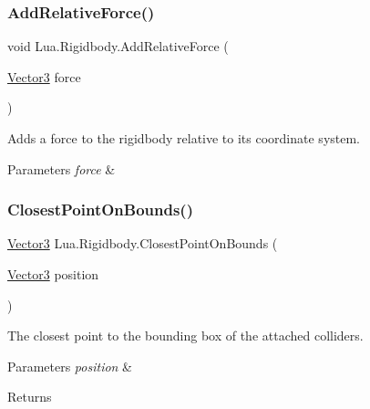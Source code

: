 \subsubsection{\texorpdfstring{AddRelativeForce()}{AddRelativeForce()}}
{\footnotesize\ttfamily void Lua.\+Rigidbody.\+Add\+Relative\+Force (\begin{DoxyParamCaption}\item[{\mbox{\hyperlink{class_lua_1_1_vector3}{Vector3}}}]{force }\end{DoxyParamCaption})}



Adds a force to the rigidbody relative to its coordinate system. 


\begin{DoxyParams}{Parameters}
{\em force} & \\
\hline
\end{DoxyParams}
\mbox{\label{class_lua_1_1_rigidbody_a267bf6dacb4ef9d2aeb0c798d2460245}} 
\subsubsection{\texorpdfstring{ClosestPointOnBounds()}{ClosestPointOnBounds()}}
{\footnotesize\ttfamily \mbox{\hyperlink{class_lua_1_1_vector3}{Vector3}} Lua.\+Rigidbody.\+Closest\+Point\+On\+Bounds (\begin{DoxyParamCaption}\item[{\mbox{\hyperlink{class_lua_1_1_vector3}{Vector3}}}]{position }\end{DoxyParamCaption})}



The closest point to the bounding box of the attached colliders. 


\begin{DoxyParams}{Parameters}
{\em position} & \\
\hline
\end{DoxyParams}
\begin{DoxyReturn}{Returns}

\end{DoxyReturn}
\mbox{\label{class_lua_1_1_rigidbody_a413146fdf9b4e57b433cbc01dc1bc288}} 
